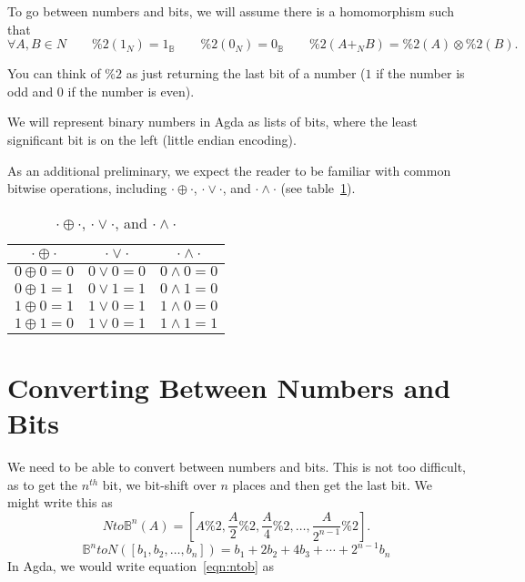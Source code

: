 \documentclass[14pt]{extarticle}  %
\begin{document}
To go between numbers and bits, we will assume there is a homomorphism
\rnc{}
such that
\[\forall A,B \in N \qquad \%2(1_{N}) = 1_{\mathbb{B}} \qquad \%2(0_{N}) = 0_{\mathbb{B}} \qquad \%2(A +_{N} B) = \%2(A) \otimes \%2(B).\]

You can think of $\%2$ as just returning the last bit of a number ($1$ if the number is odd and $0$ if the number is even).

We will represent binary numbers in Agda as lists of bits, where the least significant bit is on the left (little endian encoding).

As an additional preliminary, we expect the reader to be familiar with common bitwise operations, including $\cdot \oplus \cdot$, $\cdot \lor \cdot$, and $\cdot \land \cdot$ (see table~\ref{table:bitops}).
\begin{table}[h]
\centering
\begin{tabular}{||c c c||}
 \hline
 $\cdot \oplus \cdot$ & $\cdot \lor \cdot$ & $\cdot \land \cdot$  \\ [0.5ex]
 \hline\hline
 $0 \oplus 0 = 0$ & $0 \lor 0 = 0$ & $0 \land 0 = 0$ \\
 $0 \oplus 1 = 1$ & $0 \lor 1 = 1$ & $0 \land 1 = 0$ \\
 $1 \oplus 0 = 1$ & $1 \lor 0 = 1$ & $1 \land 0 = 0$ \\
 $1 \oplus 1 = 0$ & $1 \lor 0 = 1$ & $1 \land 1 = 1$ \\
 \hline
\end{tabular}
\caption{$\cdot \oplus \cdot$, $\cdot \lor \cdot$, and $\cdot \land \cdot$}
\label{table:bitops}
\end{table}

\section{Converting Between Numbers and Bits}
We need to be able to convert between numbers and bits. This is not too difficult, as to get the $n^{th}$ bit, we bit-shift over $n$ places
and then get the last bit. We might write this as
\begin{equation}\label{eqn:ntob}
Nto\mathbb{B}^{n}(A) = [A \% 2 , \frac{A}{2} \% 2 , \frac{A}{4} \% 2 , \ldots, \frac{A}{2^{n-1}} \%2 ].
\end{equation}
\begin{equation}\label{eqn:bton}
  \mathbb{B}^{n}toN([b_{1}, b_{2}, \ldots, b_{n}]) = b_{1} + 2b_{2}+4b_{3}+\cdots+2^{n-1}b_{n}
\end{equation}
\rnc{}
In Agda, we would write equation~\ref{eqn:ntob} as 
\end{document}
